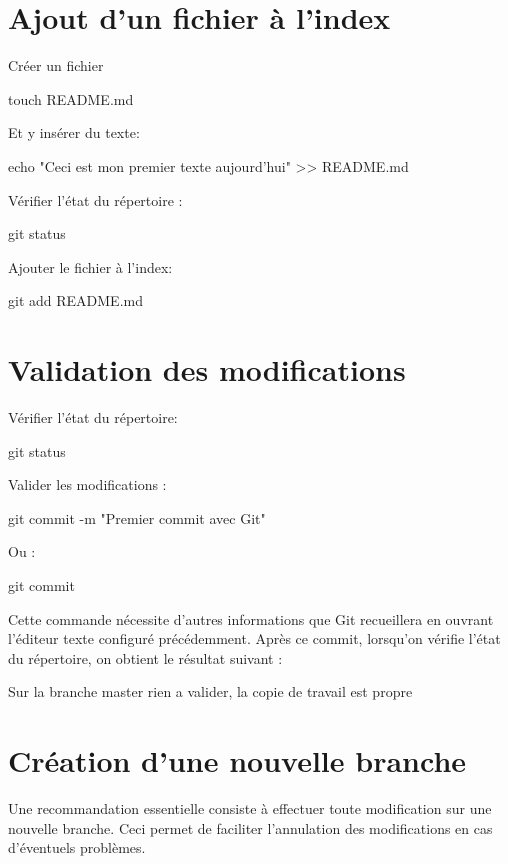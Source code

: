 \documentclass[11pt, a4paper]{book}
\begin{document}
\section{Ajout d'un fichier à l'index}
Créer un fichier 
\begin{bash}
touch README.md
\end{bash}
Et y insérer du texte:
\begin{bash}
echo "Ceci est mon premier texte aujourd'hui" >> README.md
\end{bash}
Vérifier l'état du répertoire :
\begin{bash}
git status
\end{bash}
Ajouter le fichier à l'index:
\begin{bash}
git add README.md
\end{bash}
\section{Validation des modifications}
Vérifier l'état du répertoire:
\begin{bash}
git status
\end{bash}
Valider les modifications :
\begin{bash}
git commit -m "Premier commit avec Git"
\end{bash}
Ou :
\begin{bash}
git commit
\end{bash}
Cette commande nécessite d'autres informations que Git recueillera en ouvrant l'éditeur texte configuré précédemment.
Après ce commit, lorsqu'on vérifie l'état du répertoire, on obtient le résultat suivant :

\begin{bash}
Sur la branche master
rien a valider, la copie de travail est propre
\end{bash}
\section{Création d'une nouvelle branche}
Une recommandation essentielle consiste à effectuer toute modification sur une nouvelle branche. Ceci permet de faciliter l'annulation des modifications en cas d'éventuels problèmes.
\end{document}
